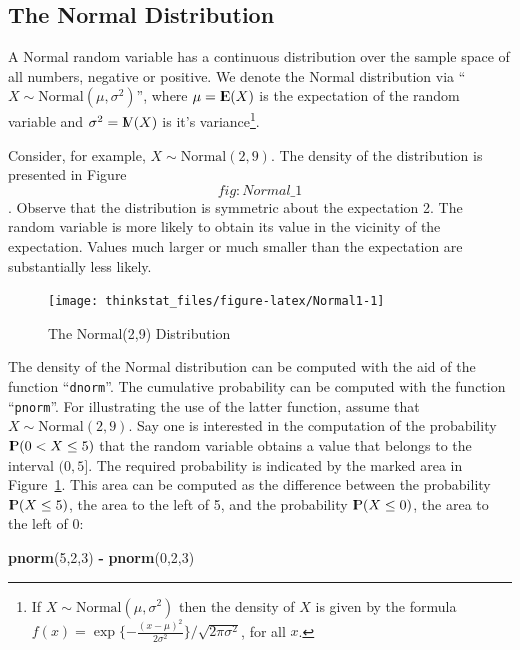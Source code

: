 \documentclass[]{krantz}
\makeatletter
\newenvironment{Shaded}{\begin{snugshade}}{\end{snugshade}}
\newcommand{\KeywordTok}[1]{\textcolor[rgb]{0.13,0.29,0.53}{\textbf{#1}}}
\newcommand{\DecValTok}[1]{\textcolor[rgb]{0.00,0.00,0.81}{#1}}
\newcommand{\StringTok}[1]{\textcolor[rgb]{0.31,0.60,0.02}{#1}}
\newcommand{\OperatorTok}[1]{\textcolor[rgb]{0.81,0.36,0.00}{\textbf{#1}}}
\newcommand{\NormalTok}[1]{#1}
\newcommand{\Expec}{{\rm I\kern-.3em E}}
\newcommand{\Prob}{{\rm I\kern-.3em P}}
\newcommand{\Var}{{\rm I\kern-.3em V}}
\newenvironment{kframe}{%
\medskip{}
\setlength{\fboxsep}{.8em}
 \def\at@end@of@kframe{}%
 \ifinner\ifhmode%
  \def\at@end@of@kframe{\end{minipage}}%
  \begin{minipage}{\columnwidth}%
 \fi\fi%
 \def\FrameCommand##1{\hskip\@totalleftmargin \hskip-\fboxsep
 \colorbox{shadecolor}{##1}\hskip-\fboxsep
     \hskip-\linewidth \hskip-\@totalleftmargin \hskip\columnwidth}%
 \MakeFramed {\advance\hsize-\width
   \@totalleftmargin\z@ \linewidth\hsize
   \@setminipage}}%
 {\par\unskip\endMakeFramed%
 \at@end@of@kframe}
\renewenvironment{Shaded}{\begin{kframe}}{\end{kframe}}
\theoremstyle{definition}
\theoremstyle{definition}
\theoremstyle{definition}
\theoremstyle{remark}
\makeatother
\begin{document}
\subsection{The Normal Distribution}\label{the-normal-distribution}

A Normal random variable has a continuous distribution over the sample
space of all numbers, negative or positive. We denote the Normal
distribution via ``\(X \sim \mathrm{Normal}(\mu, \sigma^2)\)'', where
\(\mu = \Expec(X)\) is the expectation of the random variable and
\(\sigma^2 = \Var(X)\) is it's variance\footnote{If
  \(X \sim \mbox{Normal}(\mu,\sigma^2)\) then the density of \(X\) is
  given by the formula
  \(f(x) = \exp\{-\frac{(x-\mu)^2}{2 \sigma^2}\}/\sqrt{2 \pi \sigma^2}\),
  for all \(x\).}.

Consider, for example, \(X \sim \mathrm{Normal}(2,9)\). The density of
the distribution is presented in Figure~\[fig:Normal\_1\]. Observe that
the distribution is symmetric about the expectation 2. The random
variable is more likely to obtain its value in the vicinity of the
expectation. Values much larger or much smaller than the expectation are
substantially less likely.

\begin{figure}

{\centering \texttt{[image: thinkstat\_files/figure-latex/Normal1-1]} 

}

\caption{The Normal(2,9) Distribution}\label{fig:Normal1}
\end{figure}

The density of the Normal distribution can be computed with the aid of
the function ``\texttt{dnorm}''. The cumulative probability can be
computed with the function ``\texttt{pnorm}''. For illustrating the use
of the latter function, assume that \(X \sim \mathrm{Normal}(2,9)\). Say
one is interested in the computation of the probability
\(\Prob(0 < X \leq 5)\) that the random variable obtains a value that
belongs to the interval \((0,5]\). The required probability is indicated
by the marked area in Figure~\ref{fig:Normal1}. This area can be
computed as the difference between the probability \(\Prob(X \leq 5)\),
the area to the left of 5, and the probability \(\Prob(X \leq 0)\), the
area to the left of 0:

\begin{Shaded}
\begin{Highlighting}[]
\KeywordTok{pnorm}\NormalTok{(}\DecValTok{5}\NormalTok{,}\DecValTok{2}\NormalTok{,}\DecValTok{3}\NormalTok{) }\OperatorTok{-}\StringTok{ }\KeywordTok{pnorm}\NormalTok{(}\DecValTok{0}\NormalTok{,}\DecValTok{2}\NormalTok{,}\DecValTok{3}\NormalTok{)}
\end{Highlighting}
\end{Shaded}
\end{document}
